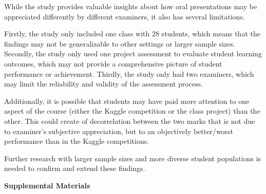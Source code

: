 \documentclass[a4paper]{article}
\begin{document}
	While the study provides valuable insights about how oral presentations may be appreciated differently by different examiners, it also has several limitations.
	
	Firstly, the study only included one class with 28 students, which means that the findings may not be generalizable to other settings or larger sample sizes.
	Secondly, the study only used one project assessment to evaluate student learning outcomes, which may not provide a comprehensive picture of student performance or achievement.
	Thirdly, the study only had two examiners, which may limit the reliability and validity of the assessment process.
	
	Additionally, it is possible that students may have paid more attention to one aspect of the course (either the Kaggle competition or the class project) than the other.
	This could create of decorrelation between the two marks that is not due to examiner's subjective appreciation, but to an objectively better/worst performance than in the Kaggle competitions.
	
	Further research with larger sample sizes and more diverse student populations is needed to confirm and extend these findings.

	
	
	
	
	\pagebreak
	\begin{center}
		\textbf{\large Supplemental Materials}
	\end{center}
	\setcounter{equation}{0}
	\setcounter{figure}{0}
	\setcounter{table}{0}
	\setcounter{page}{1}
	
	
\end{document}
